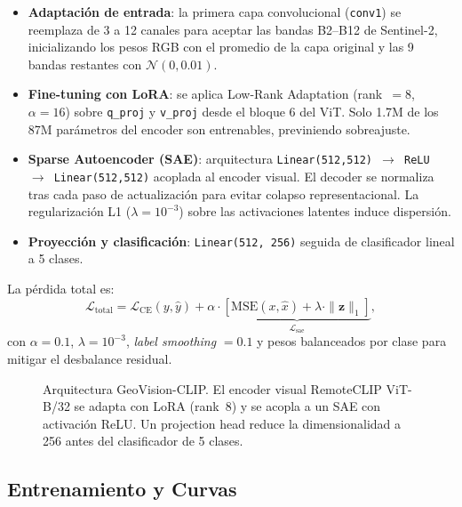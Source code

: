 \documentclass[10pt,a4paper,twocolumn]{article}
\begin{document}
\begin{itemize}[nosep, leftmargin=*, itemsep=2pt]
  \item \textbf{Adaptación de entrada}: la primera capa convolucional (\texttt{conv1}) se reemplaza de 3 a 12 canales para aceptar las bandas B2--B12 de Sentinel-2, inicializando los pesos RGB con el promedio de la capa original y las 9 bandas restantes con $\mathcal{N}(0, 0.01)$.
  \item \textbf{Fine-tuning con LoRA}: se aplica Low-Rank Adaptation (rank~$=8$, $\alpha=16$) sobre \texttt{q\_proj} y \texttt{v\_proj} desde el bloque 6 del ViT. Solo 1.7M de los 87M parámetros del encoder son entrenables, previniendo sobreajuste.
  \item \textbf{Sparse Autoencoder (SAE)}: arquitectura \texttt{Linear(512,512) $\to$ ReLU $\to$ Linear(512,512)} acoplada al encoder visual. El decoder se normaliza tras cada paso de actualización para evitar colapso representacional. La regularización L1 ($\lambda=10^{-3}$) sobre las activaciones latentes induce dispersión.
  \item \textbf{Proyección y clasificación}: \texttt{Linear(512, 256)} seguida de clasificador lineal a 5 clases.
\end{itemize}

La pérdida total es:
\begin{equation}
  \mathcal{L}_{\text{total}} = \mathcal{L}_{\text{CE}}(y, \hat{y}) + \alpha \cdot \underbrace{\left[\text{MSE}(x, \hat{x}) + \lambda \cdot \|\mathbf{z}\|_1\right]}_{\mathcal{L}_{\text{sae}}},
\end{equation}
con $\alpha=0.1$, $\lambda=10^{-3}$, \textit{label smoothing} $=0.1$ y pesos balanceados por clase para mitigar el desbalance residual.

\begin{figure}[H]
  \centering
  \caption{Arquitectura GeoVision-CLIP. El encoder visual RemoteCLIP ViT-B/32 se adapta con LoRA (rank~8) y se acopla a un SAE con activación ReLU. Un projection head reduce la dimensionalidad a 256 antes del clasificador de 5 clases.}
\end{figure}

\subsection{Entrenamiento y Curvas}
\end{document}
